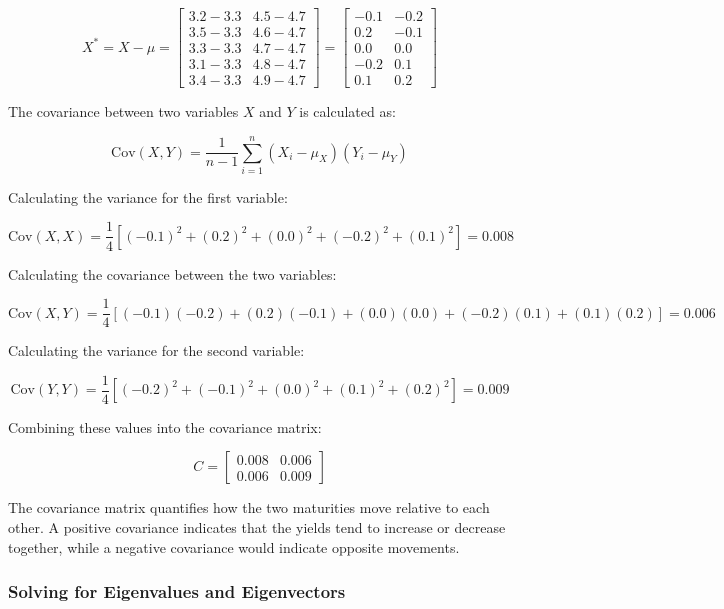 \documentclass[12pt]{article}
\begin{document}
\[
X^* = X - \mu = \begin{bmatrix} 
3.2 - 3.3 & 4.5 - 4.7 \\
3.5 - 3.3 & 4.6 - 4.7 \\
3.3 - 3.3 & 4.7 - 4.7 \\
3.1 - 3.3 & 4.8 - 4.7 \\
3.4 - 3.3 & 4.9 - 4.7 
\end{bmatrix} = \begin{bmatrix} 
-0.1 & -0.2 \\
0.2 & -0.1 \\
0.0 & 0.0 \\
-0.2 & 0.1 \\
0.1 & 0.2 
\end{bmatrix}
\]

The covariance between two variables \(X\) and \(Y\) is calculated as:

\[
\text{Cov}(X, Y) = \frac{1}{n - 1} \sum_{i=1}^n (X_i - \mu_X)(Y_i - \mu_Y)
\]

Calculating the variance for the first variable:

\[
\text{Cov}(X, X) = \frac{1}{4} \left[(-0.1)^2 + (0.2)^2 + (0.0)^2 + (-0.2)^2 + (0.1)^2 \right] = 0.008
\]

Calculating the covariance between the two variables:

\[
\text{Cov}(X, Y) = \frac{1}{4} \left[(-0.1)(-0.2) + (0.2)(-0.1) + (0.0)(0.0) + (-0.2)(0.1) + (0.1)(0.2) \right] = 0.006
\]

Calculating the variance for the second variable:

\[
\text{Cov}(Y, Y) = \frac{1}{4} \left[(-0.2)^2 + (-0.1)^2 + (0.0)^2 + (0.1)^2 + (0.2)^2 \right] = 0.009
\]

Combining these values into the covariance matrix:

\[
C = \begin{bmatrix} 
0.008 & 0.006 \\
0.006 & 0.009 
\end{bmatrix}
\]

The covariance matrix quantifies how the two maturities move relative to each other. A positive covariance indicates that the yields tend to increase or decrease together, while a negative covariance would indicate opposite movements.



\subsubsection{Solving for Eigenvalues and Eigenvectors}
\end{document}
